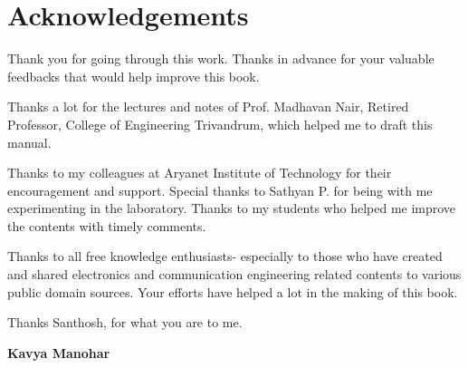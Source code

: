 \chapter*{Acknowledgements}

Thank you for going through this work. Thanks in advance for your valuable feedbacks that would help improve this book.

Thanks a lot for the lectures and notes of Prof. Madhavan Nair, Retired Professor, College of Engineering Trivandrum, which helped me to draft this manual.

Thanks to my colleagues at Aryanet Institute of Technology for their encouragement and support. Special thanks to Sathyan P. for being with me experimenting in the laboratory. Thanks to my students who helped me improve the contents with timely comments.

Thanks to all free knowledge enthusiasts- especially to those who have created and shared electronics and communication engineering related contents to various public domain sources. Your efforts have helped a lot in the making of this book.

Thanks Santhosh, for what you are to me.

\begin{flushright}
\textbf{Kavya Manohar}
\end{flushright}

